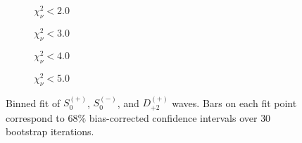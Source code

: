 \begin{figure}[htbp]
    \centering
    \begin{subfigure}{0.45\textwidth}
        
        \caption{$\chi^2_\nu < 2.0$}
    \end{subfigure}
    \hfill
    \begin{subfigure}{0.45\textwidth}
        
        \caption{$\chi^2_\nu < 3.0$}
    \end{subfigure}
    \vspace{1em}
    \begin{subfigure}{0.45\textwidth}
        
        \caption{$\chi^2_\nu < 4.0$}
    \end{subfigure}
    \hfill
    \begin{subfigure}{0.45\textwidth}
        
        \caption{$\chi^2_\nu < 5.0$}
    \end{subfigure}

    \caption{Binned fit of $S_{0}^{(+)}$, $S_{0}^{(-)}$, and $D_{+2}^{(+)}$ waves. Bars on each fit point correspond to $68\%$ bias-corrected confidence intervals over $ 30 $ bootstrap iterations.}
    \label{fig:binned-fit-all-Spn-D2p}
\end{figure}

